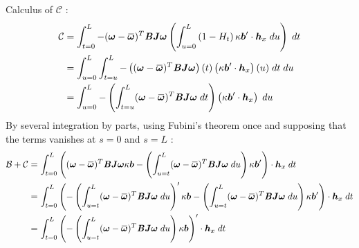 Calculus of $\mathcal{C}$ :
\begin{equation}
	\begin{aligned}
	\mathcal{C} &=
	\int_{t=0}^{L} -(\vect{\omega} - \overbar{\vect{\omega}})^T \mat{B}\mat{J}\vect{\omega}
	\left(\int_{u=0}^L \left(1-H_t\right)\kappa\vect{b}'\cdot  \vect{h}_x \;du\right)
	\;dt
	\\
	&=
	\int_{u=0}^{L}\int_{t=u}^{L}-\left((\vect{\omega} - \overbar{\vect{\omega}})^T \mat{B}\mat{J}\vect{\omega}\right)(t)
	\left(\kappa\vect{b}'\cdot \vect{h}_x\right)(u) \;dt\;du
	\\
	&=
	\int_{u=0}^{L}-\left(\int_{t=u}^{L}(\vect{\omega} - \overbar{\vect{\omega}})^T \mat{B}\mat{J}\vect{\omega}\;dt\right)
	\left(\kappa\vect{b}'\cdot \vect{h}_x\right)\;du
	\\
	\end{aligned}
\end{equation}
By several integration by parts, using Fubini's theorem once and supposing that the terms vanishes at $s=0$ and $s=L$ :
\begin{equation}
	\begin{aligned}
	\mathcal{B}+\mathcal{C} &=
	\int_{t=0}^{L} \left(
	(\vect{\omega} - \overbar{\vect{\omega}})^T \mat{B}\mat{J}\vect{\omega}
	\kappa\vect{b}
	-
	\left(\int_{u=t}^{L}(\vect{\omega} - \overbar{\vect{\omega}})^T \mat{B}\mat{J}\vect{\omega}\;du\right)
	\kappa\vect{b}'
	\right)\cdot \vect{h}_x \;dt\\
	&=
	\int_{t=0}^{L} \left(
	-\left(\int_{u=t}^{L}(\vect{\omega} - \overbar{\vect{\omega}})^T \mat{B}\mat{J}\vect{\omega}\;du\right)'
	\kappa\vect{b}
	-
	\left(\int_{u=t}^{L}(\vect{\omega} - \overbar{\vect{\omega}})^T \mat{B}\mat{J}\vect{\omega}\;du\right)
	\kappa\vect{b}'
	\right)\cdot \vect{h}_x \;dt\\
	&=
	\int_{t=0}^{L} \left(
	-\left(\int_{u=t}^{L}(\vect{\omega} - \overbar{\vect{\omega}})^T \mat{B}\mat{J}\vect{\omega}\;du\right)
	\kappa\vect{b}
	\right)'\cdot \vect{h}_x \;dt\\
	\end{aligned}
\end{equation}

